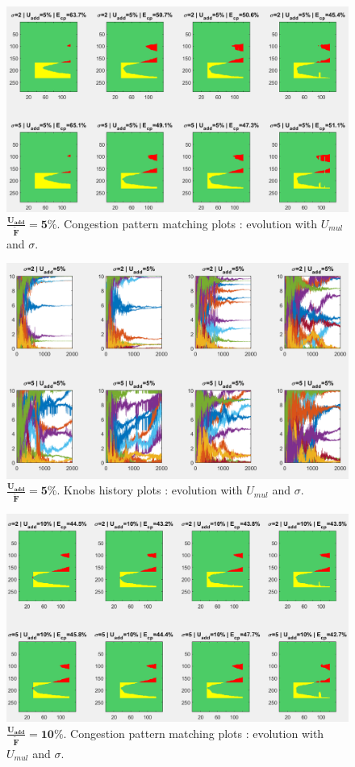 \begin{figure}[h]
	\label{fig:uaddcp5}
	\caption{$\mathbf{\frac{U_{add}}{\widetilde{F}}=5\%}$. Congestion pattern matching plots : evolution with $U_{mul}$ and $\sigma$.}
	\includegraphics[width=7in]{figures/results_figures/Uadd/cp_Uadd_5_lambda_11.png}
\end{figure}	
\begin{figure}[h]
	\label{fig:uaddknobs5}
	\caption{$\mathbf{\frac{U_{add}}{\widetilde{F}}=5\%}$. Knobs history plots : evolution with $U_{mul}$ and $\sigma$.}
	\includegraphics[width=7in]{figures/results_figures/Uadd/knobs_Uadd_5_lambda_11.png}
\end{figure}
\begin{figure}[h]
	\label{fig:uaddcp10}
	\caption{$\mathbf{\frac{U_{add}}{\widetilde{F}}=10\%}$. Congestion pattern matching plots : evolution with $U_{mul}$ and $\sigma$.}
	\includegraphics[width=7in]{figures/results_figures/Uadd/cp_Uadd_10_lambda_11.png}
\end{figure}	
